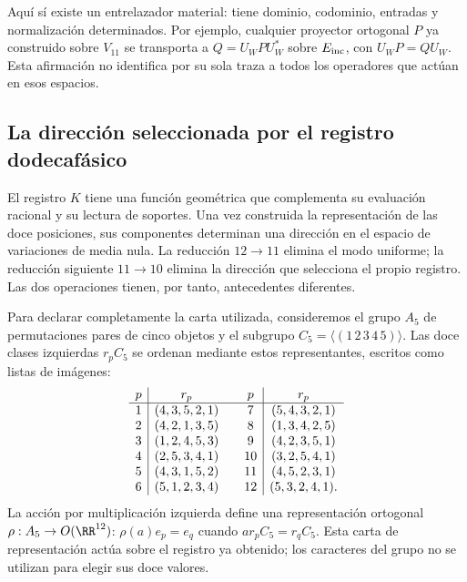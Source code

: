 Aquí sí existe un entrelazador material: tiene dominio, codominio,
entradas y normalización determinados. Por ejemplo, cualquier
proyector ortogonal $P$ ya construido sobre $V_{11}$ se transporta a
$Q=U_WPU_W^*$ sobre $E_{\rm inc}$, con
$U_WP=QU_W$. Esta afirmación no identifica por su sola traza a todos
los operadores que actúan en esos espacios.


\subsection{La dirección seleccionada por el registro dodecafásico}
\label{x_reciprocidad:exc:k-direccion}

El registro \(K\) tiene una función geométrica que complementa su
evaluación racional y su lectura de soportes. Una vez construida la
representación de las doce posiciones, sus componentes determinan una
dirección en el espacio de variaciones de media nula. La reducción
\(12\to11\) elimina el modo uniforme; la reducción siguiente
\(11\to10\) elimina la dirección que selecciona el propio registro.
Las dos operaciones tienen, por tanto, antecedentes diferentes.

Para declarar completamente la carta utilizada, consideremos el grupo
\(A_5\) de permutaciones pares de cinco objetos y el subgrupo
\(C_5=\langle(1\,2\,3\,4\,5)\rangle\). Las doce clases izquierdas
\(r_pC_5\) se ordenan mediante estos representantes, escritos como
listas de imágenes:
\[
\begin{array}{c|c@{\qquad}c|c}
p&r_p&p&r_p\\ \hline
1&(4,3,5,2,1)&7&(5,4,3,2,1)\\
2&(4,2,1,3,5)&8&(1,3,4,2,5)\\
3&(1,2,4,5,3)&9&(4,2,3,5,1)\\
4&(2,5,3,4,1)&10&(3,2,5,4,1)\\
5&(4,3,1,5,2)&11&(4,5,2,3,1)\\
6&(5,1,2,3,4)&12&(5,3,2,4,1).
\end{array}
\]
La acción por multiplicación izquierda define una representación
ortogonal \(\rho:A_5\to O(\RR^{12})\):
\(\rho(a)e_p=e_q\) cuando \(ar_pC_5=r_qC_5\).
Esta carta de representación actúa sobre el registro ya obtenido;
los caracteres del grupo no se utilizan para elegir sus doce valores.


